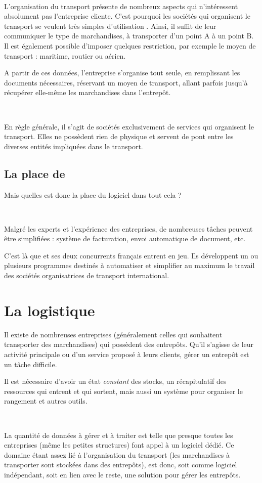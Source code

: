 ~

L'organisation du transport présente de nombreux aspects qui n'intéressent absolument pas l'entreprise cliente. C'est pourquoi les sociétés qui organisent le transport se veulent très simples \og d'utilisation \fg.
Ainsi, il suffit de leur communiquer le type de marchandises, à transporter d'un point A à un point B. Il est également possible d'imposer quelques restriction, par exemple le moyen de transport : maritime, routier ou aérien.

A partir de ces données, l'entreprise s'organise tout seule, en remplissant les documents nécessaires, réservant un moyen de transport, allant parfois jusqu'à récupérer elle-même les marchandises dans l'entrepôt.

~

En règle générale, il s'agit de sociétés exclusivement de services qui organisent le transport. Elles ne possèdent rien de physique et servent de pont entre les diverses entités impliquées dans le transport.


\subsection{La place de \integrale}
Mais quelles est donc la place du logiciel \integrale{} dans tout cela ?

~

Malgré les experts et l'expérience des entreprises, de nombreuses tâches peuvent être simplifiées : système de facturation, envoi automatique de document, etc.

C'est là que \solulog{} et ses deux concurrents français entrent en jeu. Ils développent un ou plusieurs programmes destinés à automatiser et simplifier au maximum le travail des sociétés organisatrices de transport international.


\section{La logistique}
Il existe de nombreuses entreprises (généralement celles qui souhaitent transporter des marchandises) qui possèdent des entrepôts. Qu'il s'agisse de leur activité principale ou d'un service proposé à leurs clients, gérer un entrepôt est un tâche difficile.

Il est nécessaire d'avoir un état \emph{constant} des stocks, un récapitulatif des ressources qui entrent et qui sortent, mais aussi un système pour organiser le rangement et autres outils.

~

La quantité de données à gérer et à traiter est telle que presque toutes les entreprises (même les petites structures) font appel à un logiciel dédié. Ce domaine étant assez lié à l'organisation du transport (les marchandises à transporter sont stockées dans des entrepôts), \integrale{} est donc, soit comme logiciel indépendant, soit en lien avec le reste, une solution pour gérer les entrepôts.
